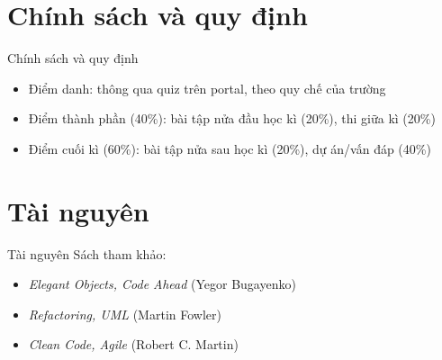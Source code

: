 \documentclass{beamer}
\begin{document}
\section{Chính sách và quy định}

\begin{frame}{Chính sách và quy định}
    \begin{itemize}
        \item Điểm danh: thông qua quiz trên portal, theo quy chế của trường
        \item Điểm thành phần (40\%): bài tập nửa đầu học kì (20\%), thi giữa kì (20\%) 
        \item Điểm cuối kì (60\%): bài tập nửa sau học kì (20\%), dự án/vấn đáp (40\%)
    \end{itemize}
\end{frame}

\section{Tài nguyên}

\begin{frame}{Tài nguyên}
    Sách tham khảo:
    \begin{itemize}
        \item \textit{Elegant Objects, Code Ahead} (Yegor Bugayenko)
        \item \textit{Refactoring, UML} (Martin Fowler)
        \item \textit{Clean Code, Agile} (Robert C. Martin)
    \end{itemize}
\end{frame}






\end{document}
